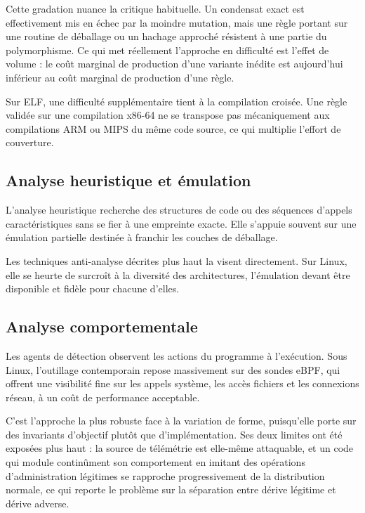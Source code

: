 Cette gradation nuance la critique habituelle. Un condensat exact est effectivement mis en échec par la moindre mutation, mais une règle portant sur une routine de déballage ou un hachage approché résistent à une partie du polymorphisme. Ce qui met réellement l'approche en difficulté est l'effet de volume : le coût marginal de production d'une variante inédite est aujourd'hui inférieur au coût marginal de production d'une règle.

Sur ELF, une difficulté supplémentaire tient à la compilation croisée. Une règle validée sur une compilation x86-64 ne se transpose pas mécaniquement aux compilations ARM ou MIPS du même code source, ce qui multiplie l'effort de couverture.

\subsection{Analyse heuristique et émulation}

L'analyse heuristique recherche des structures de code ou des séquences d'appels caractéristiques sans se fier à une empreinte exacte. Elle s'appuie souvent sur une émulation partielle destinée à franchir les couches de déballage.

Les techniques anti-analyse décrites plus haut la visent directement. Sur Linux, elle se heurte de surcroît à la diversité des architectures, l'émulation devant être disponible et fidèle pour chacune d'elles.

\subsection{Analyse comportementale}

Les agents de détection observent les actions du programme à l'exécution. Sous Linux, l'outillage contemporain repose massivement sur des sondes eBPF, qui offrent une visibilité fine sur les appels système, les accès fichiers et les connexions réseau, à un coût de performance acceptable.

C'est l'approche la plus robuste face à la variation de forme, puisqu'elle porte sur des invariants d'objectif plutôt que d'implémentation. Ses deux limites ont été exposées plus haut : la source de télémétrie est elle-même attaquable, et un code qui module continûment son comportement en imitant des opérations d'administration légitimes se rapproche progressivement de la distribution normale, ce qui reporte le problème sur la séparation entre dérive légitime et dérive adverse.

